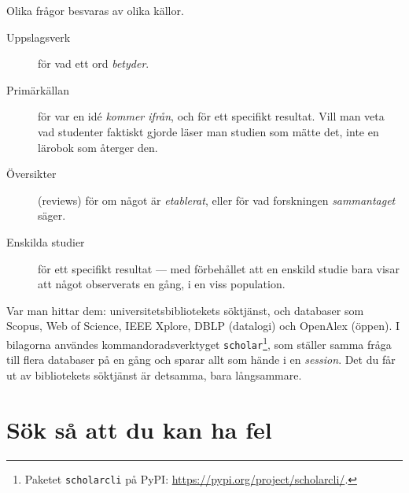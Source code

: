 Olika frågor besvaras av olika källor.
\begin{description}
  \item[Uppslagsverk] för vad ett ord \emph{betyder}.
  \item[Primärkällan] för var en idé \emph{kommer ifrån}, och för ett
    specifikt resultat.  Vill man veta vad studenter faktiskt gjorde
    läser man studien som mätte det, inte en lärobok som återger den.
  \item[Översikter] (\foreignlanguage{english}{reviews}) för om något är
    \emph{etablerat}, eller för vad forskningen \emph{sammantaget}
    säger.
  \item[Enskilda studier] för ett specifikt resultat --- med förbehållet
    att en enskild studie bara visar att något observerats en gång, i en
    viss population.
\end{description}
Var man hittar dem: universitetsbibliotekets söktjänst, och databaser som
Scopus, Web of Science, IEEE Xplore, DBLP (datalogi) och OpenAlex
(öppen).  I bilagorna användes kommandoradsverktyget
\texttt{scholar}\footnote{Paketet \texttt{scholarcli} på PyPI:
  \url{https://pypi.org/project/scholarcli/}.}, som ställer samma fråga
till flera databaser på en gång och sparar allt som hände i en
\emph{session}.  Det du får ut av bibliotekets söktjänst är detsamma,
bara långsammare.

\section{Sök så att du kan ha fel}

